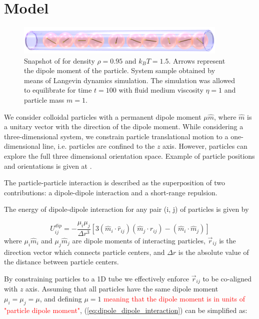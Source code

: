 \section{Model}
\label{sec:model}

\begin{figure}[t]
\centering
	\includegraphics[width=0.9\textwidth]{Images/fullSystemPicture}
	\captionsetup{justification=centering, width=0.9\textwidth}
	\caption{Snapshot of for density $\rho = 0.95$ and $k_BT = 1.5$. Arrows represent the dipole moment of the particle. System sample obtained by means of Langevin dynamics simulation. The simulation was allowed to equilibrate for time $t = 100$ with fluid medium viscosity $\eta = 1$ and particle mass $m = 1$.}
	\label{fig:fullSystemPicture}
\end{figure}

We consider colloidal particles with a permanent dipole moment $\mu \hat{m}$, where $\hat{m}$ is a unitary vector with the direction of the dipole moment. While considering a three-dimensional system, we constrain particle translational motion to a one-dimensional line, i.e. particles are confined to the $z$ axis. However, particles can explore the full three dimensional orientation space. Example of particle positions and orientations is given at .

The particle-particle interaction is described as the superposition of two contributions: a dipole-dipole interaction and a short-range repulsion.

The energy of dipole-dipole interaction for any pair (i, j) of particles is given by

\begin{equation}
\label{eq:dipole_dipole_interaction}
U^{dip}_{ij} =
	- \frac{\mu_i \mu_j}{\Delta r^3}[
		3 (\hat{m}_i \cdot \hat{r}_{ij})(\hat{m}_j \cdot \hat{r}_{ij})
		- (\hat{m}_i \cdot \hat{m}_j)
	]
\end{equation}
where $\mu_i \hat{m}_i$ and $\mu_j \hat{m}_j$ are dipole moments of interacting particles, $\vec{r}_{ij}$ is the direction vector which connects particle centers, and $\Delta r$ is the absolute value of the distance between particle centers.

By constraining particles to a 1D tube we effectively enforce $\vec{r}_{ij}$ to be co-aligned with $z$ axis. Assuming that all particles have the same dipole moment $\mu_i = \mu_j = \mu$, and defining $\mu = 1$ \textcolor{red}{meaning that the dipole moment is in units of "particle dipole moment"}, (\ref{eq:dipole_dipole_interaction}) can be simplified as:

